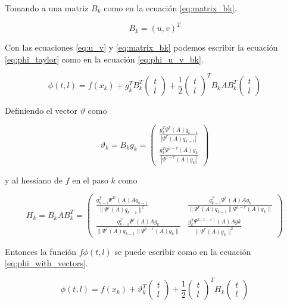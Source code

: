 Tomando a una matriz $B_k$ como en la ecuación \ref{eq:matrix_bk}.

\begin{equation}
	B_k =  \left(u, v\right)^T \label{eq:matrix_bk}
\end{equation}

Con las ecuaciones \ref{eq:u_v} y \ref{eq:matrix_bk} podemos escribir la ecuación \ref{eq:phi_taylor} como en la ecuación \ref{eq:phi_u_v_bk}.

\begin{equation}
	\phi(t, l) =  f(x_k)+g_k^TB_k^T\begin{pmatrix}t\\l\end{pmatrix} +\frac{1}{2}\begin{pmatrix}t\\l\end{pmatrix}^TB_k A B_k^T\begin{pmatrix}t\\l\end{pmatrix} \label{eq:phi_u_v_bk}
\end{equation}

Definiendo el vector $\vartheta$ como

\begin{equation}
	\vartheta_k = B_kg_k =
	\begin{pmatrix}
		\frac{g_k^T\Psi^r(A)q_{k-1}}{|\Psi^{r}(A)q_{k-1}|} \\[0.25cm]
		\frac{g_k^T\Psi^{1-r}(A)g_k}{|\Psi^{1-r}(A)g_k|}
	\end{pmatrix}
	\label{eq:vartheta_k}
\end{equation}

y al hessiano de $f$ en el paso $k$ como

\begin{equation}
	H_k = B_kAB_k^T =\begin{pmatrix}
		\frac{q_{k-1}^T\Psi^{2r}(A)Aq_{k-1}}{\|\Psi^{r}(A)q_{k-1}\|^2}             & \frac{q_{k-1}^T\Psi^r(A)Ag_{k}}{\|\Psi^{r}(A)q_{k-1}\|\Psi^{1-r}(A)g_k\| } \\
		\frac{q_{k-1}^T\Psi^r(A)Ag_{k}}{\|\Psi^{r}(A)q_{k-1}\|\Psi^{1-r}(A)g_k\| } &
		\frac{g_k^T\Psi^{2(1-r)}(A)Ag{k}}{\|\Psi^{r}(A)g_k\|^2}
	\end{pmatrix} \label{eq:hk_bkabk}
\end{equation}

Entonces la función $f\phi(t, l)$ se puede escribir como en la ecuación \ref{eq:phi_with_vectors}.

\begin{equation}
	\phi(t, l) =  f(x_k)+\vartheta_k^T
	\begin{pmatrix}
		t \\l
	\end{pmatrix} +\frac{1}{2}
	\begin{pmatrix}
		t \\l
	\end{pmatrix}^T
	H_k
	\begin{pmatrix}
		t \\l
	\end{pmatrix} \label{eq:phi_with_vectors}
\end{equation}


